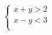 \documentclass[a4paper,14pt]{article}
\begin{document}
\begin{multicols}{2}
\begin{enumerate}
\begin{enumerate}[a)]
    	    	$
    	    	\begin{cases}
    	    		x + y > 2 \\
    	    		x - y < 3 \\
    	    	\end{cases}	
        	    $\\\\\\\\\\\\\\\\\\\\\\\\\\\\\\\\\\\\\\\\\\\\\\\\\\\\\\\\
        	    

\end{enumerate}
\end{enumerate}
\end{multicols}
\end{document}
